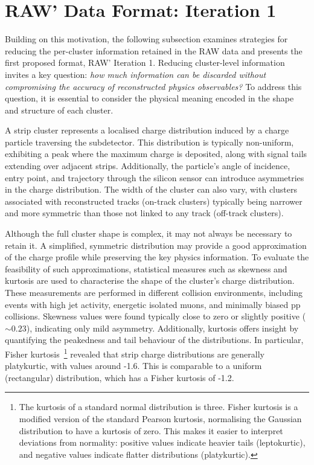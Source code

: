 \section{RAW' Data Format: Iteration 1}
\label{Section:Chapter5-RAW'_Iteration_1}
Building on this motivation, the following subsection examines strategies for reducing the per-cluster information retained in the RAW data and presents the first proposed format, RAW' Iteration 1. Reducing cluster-level information invites a key question: \textit{how much information can be discarded without compromising the accuracy of reconstructed physics observables?} To address this question, it is essential to consider the physical meaning encoded in the shape and structure of each cluster. 

A strip cluster represents a localised charge distribution induced by a charge particle traversing the subdetector. This distribution is typically non-uniform, exhibiting a peak where the maximum charge is deposited, along with signal tails extending over adjacent strips. Additionally, the particle's angle of incidence, entry point, and trajectory through the silicon sensor can introduce asymmetries in the charge distribution. The width of the cluster can also vary, with clusters associated with reconstructed tracks (on-track clusters) typically being narrower and more symmetric than those not linked to any track (off-track clusters).

Although the full cluster shape is complex, it may not always be necessary to retain it. A simplified, symmetric distribution may provide a good approximation of the charge profile while preserving the key physics information. To evaluate the feasibility of such approximations, statistical measures such as skewness and kurtosis are used to characterise the shape of the cluster's charge distribution. These measurements are performed in different collision environments, including events with high jet activity, energetic isolated muons, and minimally biased pp collisions. Skewness values were found typically close to zero or slightly positive ($\sim 0.23$), indicating only mild asymmetry. Additionally, kurtosis offers insight by quantifying the peakedness and tail behaviour of the distributions. In particular, Fisher kurtosis~\cite{Kurtosis}\footnote{The kurtosis of a standard normal distribution is three. Fisher kurtosis is a modified version of the standard Pearson kurtosis, normalising the Gaussian distribution to have a kurtosis of zero. This makes it easier to interpret deviations from normality: positive values indicate heavier tails (leptokurtic), and negative values indicate flatter distributions (platykurtic).} revealed that strip charge distributions are generally platykurtic, with values around -1.6. This is comparable to a uniform (rectangular) distribution, which has a Fisher kurtosis of -1.2.

